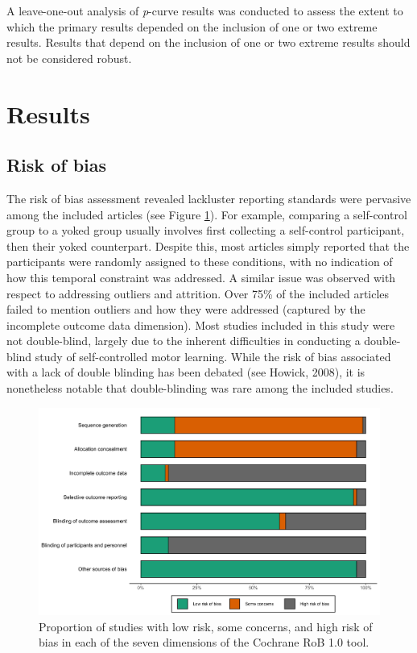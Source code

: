 \documentclass[
  english,
  man, donotrepeattitle,floatsintext]{apa7}
\begin{document}
A leave-one-out analysis of \emph{p}-curve results was conducted to assess the extent to which the primary results depended on the inclusion of one or two extreme results. Results that depend on the inclusion of one or two extreme results should not be considered robust.

\hypertarget{results}{%
\section{Results}\label{results}}

\hypertarget{risk-of-bias-1}{%
\subsection{Risk of bias}\label{risk-of-bias-1}}

The risk of bias assessment revealed lackluster reporting standards were pervasive among the included articles (see Figure \ref{fig:fig2}). For example, comparing a self-control group to a yoked group usually involves first collecting a self-control participant, then their yoked counterpart. Despite this, most articles simply reported that the participants were randomly assigned to these conditions, with no indication of how this temporal constraint was addressed. A similar issue was observed with respect to addressing outliers and attrition. Over 75\% of the included articles failed to mention outliers and how they were addressed (captured by the incomplete outcome data dimension). Most studies included in this study were not double-blind, largely due to the inherent difficulties in conducting a double-blind study of self-controlled motor learning. While the risk of bias associated with a lack of double blinding has been debated (see Howick, 2008), it is nonetheless notable that double-blinding was rare among the included studies.



\begin{figure}

{\centering \includegraphics[height=0.81\textheight]{../../figs/fig2} 

}

\caption{Proportion of studies with low risk, some concerns, and high risk of bias in each of the seven dimensions of the Cochrane RoB 1.0 tool.}\label{fig:fig2}
\end{figure}
\end{document}
